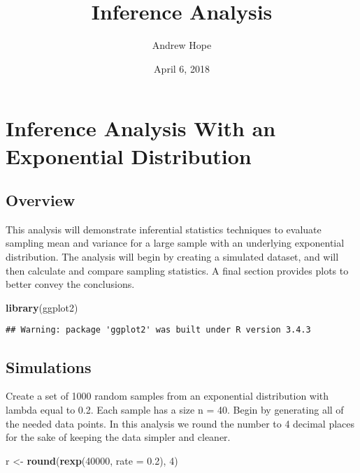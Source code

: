 \documentclass[]{article}
\title{Inference Analysis}
\author{Andrew Hope}
\date{April 6, 2018}
\newenvironment{Shaded}{\begin{snugshade}}{\end{snugshade}}
\newcommand{\KeywordTok}[1]{\textcolor[rgb]{0.13,0.29,0.53}{\textbf{{#1}}}}
\newcommand{\DataTypeTok}[1]{\textcolor[rgb]{0.13,0.29,0.53}{{#1}}}
\newcommand{\DecValTok}[1]{\textcolor[rgb]{0.00,0.00,0.81}{{#1}}}
\newcommand{\FloatTok}[1]{\textcolor[rgb]{0.00,0.00,0.81}{{#1}}}
\newcommand{\StringTok}[1]{\textcolor[rgb]{0.31,0.60,0.02}{{#1}}}
\newcommand{\NormalTok}[1]{{#1}}
\begin{document}
\maketitle

\section{Inference Analysis With an Exponential
Distribution}\label{inference-analysis-with-an-exponential-distribution}

\subsection{Overview}\label{overview}

This analysis will demonstrate inferential statistics techniques to
evaluate sampling mean and variance for a large sample with an
underlying exponential distribution. The analysis will begin by creating
a simulated dataset, and will then calculate and compare sampling
statistics. A final section provides plots to better convey the
conclusions.

\begin{Shaded}
\begin{Highlighting}[]
\KeywordTok{library}\NormalTok{(ggplot2)}
\end{Highlighting}
\end{Shaded}

\begin{verbatim}
## Warning: package 'ggplot2' was built under R version 3.4.3
\end{verbatim}

\subsection{Simulations}\label{simulations}

Create a set of 1000 random samples from an exponential distribution
with lambda equal to 0.2. Each sample has a size n = 40. Begin by
generating all of the needed data points. In this analysis we round the
number to 4 decimal places for the sake of keeping the data simpler and
cleaner.

\begin{Shaded}
\begin{Highlighting}[]
\NormalTok{r <-}\StringTok{ }\KeywordTok{round}\NormalTok{(}\KeywordTok{rexp}\NormalTok{(}\DecValTok{40000}\NormalTok{, }\DataTypeTok{rate =} \FloatTok{0.2}\NormalTok{), }\DecValTok{4}\NormalTok{)}
\end{Highlighting}
\end{Shaded}
\end{document}
